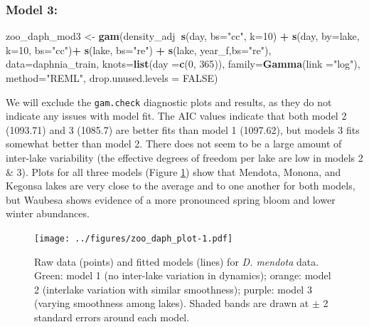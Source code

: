 \documentclass[12pt]{article}
\newenvironment{Shaded}{\begin{snugshade}}{\end{snugshade}}
\newcommand{\KeywordTok}[1]{\textcolor[rgb]{0.13,0.29,0.53}{\textbf{#1}}}
\newcommand{\DataTypeTok}[1]{\textcolor[rgb]{0.13,0.29,0.53}{#1}}
\newcommand{\DecValTok}[1]{\textcolor[rgb]{0.00,0.00,0.81}{#1}}
\newcommand{\StringTok}[1]{\textcolor[rgb]{0.31,0.60,0.02}{#1}}
\newcommand{\OtherTok}[1]{\textcolor[rgb]{0.56,0.35,0.01}{#1}}
\newcommand{\OperatorTok}[1]{\textcolor[rgb]{0.81,0.36,0.00}{\textbf{#1}}}
\newcommand{\NormalTok}[1]{#1}
\begin{document}
\subsubsection{Model 3:}\label{model-3}

\begin{Shaded}
\begin{Highlighting}[]
\NormalTok{zoo_daph_mod3 <-}\StringTok{ }\KeywordTok{gam}\NormalTok{(density_adj}\OperatorTok{~}\KeywordTok{s}\NormalTok{(day, }\DataTypeTok{bs=}\StringTok{"cc"}\NormalTok{, }\DataTypeTok{k=}\DecValTok{10}\NormalTok{) }\OperatorTok{+}
\StringTok{                             }\KeywordTok{s}\NormalTok{(day, }\DataTypeTok{by=}\NormalTok{lake, }\DataTypeTok{k=}\DecValTok{10}\NormalTok{, }\DataTypeTok{bs=}\StringTok{"cc"}\NormalTok{)}\OperatorTok{+}
\StringTok{                             }\KeywordTok{s}\NormalTok{(lake, }\DataTypeTok{bs=}\StringTok{"re"}\NormalTok{) }\OperatorTok{+}\StringTok{ }
\StringTok{                             }\KeywordTok{s}\NormalTok{(lake, year_f,}\DataTypeTok{bs=}\StringTok{"re"}\NormalTok{),}
                     \DataTypeTok{data=}\NormalTok{daphnia_train,}
                     \DataTypeTok{knots=}\KeywordTok{list}\NormalTok{(}\DataTypeTok{day =}\KeywordTok{c}\NormalTok{(}\DecValTok{0}\NormalTok{, }\DecValTok{365}\NormalTok{)),}
                     \DataTypeTok{family=}\KeywordTok{Gamma}\NormalTok{(}\DataTypeTok{link =}\StringTok{"log"}\NormalTok{),}
                     \DataTypeTok{method=}\StringTok{"REML"}\NormalTok{,}
                     \DataTypeTok{drop.unused.levels =} \OtherTok{FALSE}\NormalTok{)}
\end{Highlighting}
\end{Shaded}

We will exclude the \texttt{gam.check} diagnostic plots and results, as
they do not indicate any issues with model fit. The AIC values indicate
that both model 2 (1093.71) and 3 (1085.7) are better fits than model 1
(1097.62), but models 3 fits somewhat better than model 2. There does
not seem to be a large amount of inter-lake variability (the effective
degrees of freedom per lake are low in models 2 \& 3). Plots for all
three models (Figure \ref{fig:daph_smooth}) show that Mendota, Monona,
and Kegonsa lakes are very close to the average and to one another for
both models, but Waubesa shows evidence of a more pronounced spring
bloom and lower winter abundances.

\begin{figure}
\centering
\texttt{[image: ../figures/zoo\_daph\_plot-1.pdf]}
\caption{\label{fig:daph_smooth}Raw data (points) and fitted models
(lines) for \textit{D. mendota} data. Green: model 1 (no inter-lake
variation in dynamics); orange: model 2 (interlake variation with
similar smoothness); purple: model 3 (varying smoothness among lakes).
Shaded bands are drawn at \(\pm\) 2 standard errors around each model.}
\end{figure}
\end{document}
